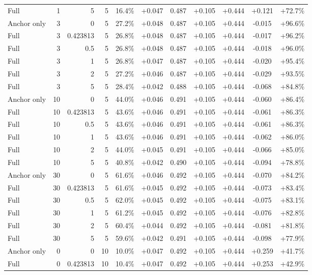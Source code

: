\begin{table}[htbp]
\begin{tabular}{lrrrccccccc}
Full & 1 & 5 & 5 & 16.4\% & +0.047 & 0.487 & +0.105 & +0.444 & +0.121 & +72.7\% \\
Anchor only & 3 & 0 & 5 & 27.2\% & +0.048 & 0.487 & +0.105 & +0.444 & -0.015 & +96.6\% \\
Full & 3 & 0.423813 & 5 & 26.8\% & +0.048 & 0.487 & +0.105 & +0.444 & -0.017 & +96.2\% \\
Full & 3 & 0.5 & 5 & 26.8\% & +0.048 & 0.487 & +0.105 & +0.444 & -0.018 & +96.0\% \\
Full & 3 & 1 & 5 & 26.8\% & +0.047 & 0.487 & +0.105 & +0.444 & -0.020 & +95.4\% \\
Full & 3 & 2 & 5 & 27.2\% & +0.046 & 0.487 & +0.105 & +0.444 & -0.029 & +93.5\% \\
Full & 3 & 5 & 5 & 28.4\% & +0.042 & 0.488 & +0.105 & +0.444 & -0.068 & +84.8\% \\
Anchor only & 10 & 0 & 5 & 44.0\% & +0.046 & 0.491 & +0.105 & +0.444 & -0.060 & +86.4\% \\
Full & 10 & 0.423813 & 5 & 43.6\% & +0.046 & 0.491 & +0.105 & +0.444 & -0.061 & +86.3\% \\
Full & 10 & 0.5 & 5 & 43.6\% & +0.046 & 0.491 & +0.105 & +0.444 & -0.061 & +86.3\% \\
Full & 10 & 1 & 5 & 43.6\% & +0.046 & 0.491 & +0.105 & +0.444 & -0.062 & +86.0\% \\
Full & 10 & 2 & 5 & 44.0\% & +0.045 & 0.491 & +0.105 & +0.444 & -0.066 & +85.0\% \\
Full & 10 & 5 & 5 & 40.8\% & +0.042 & 0.490 & +0.105 & +0.444 & -0.094 & +78.8\% \\
Anchor only & 30 & 0 & 5 & 61.6\% & +0.046 & 0.492 & +0.105 & +0.444 & -0.070 & +84.2\% \\
Full & 30 & 0.423813 & 5 & 61.6\% & +0.045 & 0.492 & +0.105 & +0.444 & -0.073 & +83.4\% \\
Full & 30 & 0.5 & 5 & 62.0\% & +0.045 & 0.492 & +0.105 & +0.444 & -0.075 & +83.1\% \\
Full & 30 & 1 & 5 & 61.2\% & +0.045 & 0.492 & +0.105 & +0.444 & -0.076 & +82.8\% \\
Full & 30 & 2 & 5 & 60.4\% & +0.044 & 0.492 & +0.105 & +0.444 & -0.081 & +81.8\% \\
Full & 30 & 5 & 5 & 59.6\% & +0.042 & 0.491 & +0.105 & +0.444 & -0.098 & +77.9\% \\
Anchor only & 0 & 0 & 10 & 10.0\% & +0.047 & 0.492 & +0.105 & +0.444 & +0.259 & +41.7\% \\
Full & 0 & 0.423813 & 10 & 10.4\% & +0.047 & 0.492 & +0.105 & +0.444 & +0.253 & +42.9\% \\

\end{tabular}
\end{table}
